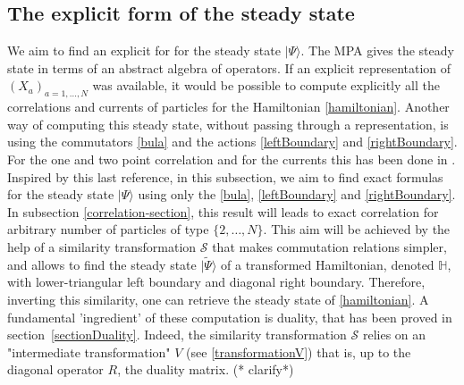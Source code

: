 \documentclass[11pt]{article}
\numberwithin{equation}{section}
\numberwithin{equation}{subsection}
\newcommand{\com}[1]{{ (* {\color{red}\small #1}*)}}
\begin{document}
\subsection{The explicit form of the steady state}\label{subsection-exact}
We aim to find an explicit for for the steady state $|\Psi\rangle$. The MPA gives the steady state in terms of an abstract algebra of operators. If an explicit representation of $(X_{a})_{a=1,\ldots,N}$ was available, it would be possible to compute explicitly all the correlations and currents of particles for the Hamiltonian \eqref{hamiltonian}. Another way of computing this steady state, without passing through a representation, is using the commutators \eqref{bula} and the actions \eqref{leftBoundary} and \eqref{rightBoundary}. For the one and two point correlation and for the currents this has been done in \cite{vanicat2017exact}. Inspired by this last reference, in this subsection, we aim to find exact formulas for the steady state  $|\Psi\rangle$ using only the \eqref{bula}, \eqref{leftBoundary} and \eqref{rightBoundary}. In subsection \ref{correlation-section}, this result will leads to exact correlation for arbitrary number of particles of type $\{2,\ldots,N\}$. This aim will be achieved by the help of a similarity transformation $\mathcal{S}$ that makes commutation relations simpler, and allows to find the steady state $|\widetilde\Psi\rangle$ of a transformed Hamiltonian, denoted  $\mathbb{H}$, with lower-triangular left boundary and diagonal right boundary. Therefore, inverting this similarity, one can retrieve the steady state of \eqref{hamiltonian}. A fundamental 'ingredient' of these computation is duality, that has been proved in section~\ref{sectionDuality}. Indeed, the similarity transformation $\mathcal{S}$ relies on an "intermediate transformation" $V$ (see \eqref{transformationV}) that is, up to the diagonal operator $R$, the duality matrix. \com{clarify}
\end{document}
